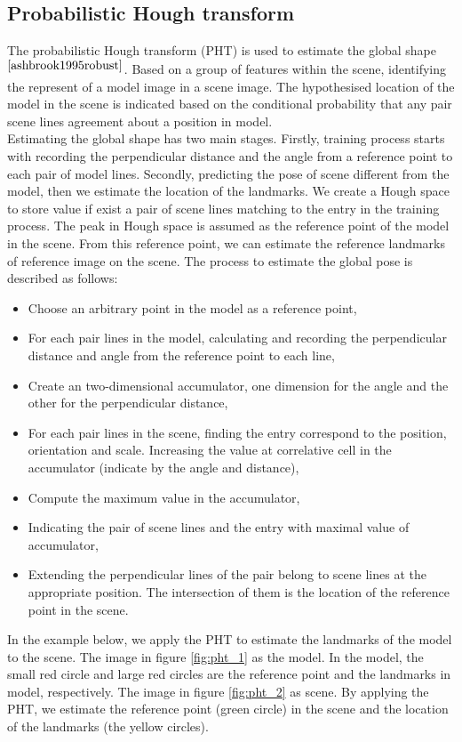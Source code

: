 \subsection{Probabilistic Hough transform}
The probabilistic Hough transform (PHT) is used to estimate the global shape$^{\cite{ashbrook1995robust}}$. Based on a group of features within the scene, identifying the represent of a model image in a scene image. The hypothesised location of the model in the scene is indicated based on the conditional probability that any pair scene lines agreement about a position in model.\\[0.3cm]
Estimating the global shape has two main stages. Firstly, training process starts with recording the perpendicular distance and the angle from a reference point to each pair of model lines. Secondly, predicting the pose of scene different from the model, then we estimate the location of the landmarks. We create a Hough space to store value if exist a pair of scene lines matching to the entry in the training process. The peak in Hough space is assumed as the reference point of the model in the scene. From this reference point, we can estimate the reference landmarks of reference image on the scene.
The process to estimate the global pose is described as follows:
\begin{itemize}
\item Choose an arbitrary point in the model as a reference point,
\item For each pair lines in the model, calculating and recording the perpendicular distance and angle from the reference point to each line,
\item Create an two-dimensional accumulator, one dimension for the angle and the other for the perpendicular distance,
\item For each pair lines in the scene, finding the entry correspond to the position, orientation and scale. Increasing the value at correlative cell in the accumulator (indicate by the angle and distance),
\item Compute the maximum value in the accumulator,
\item Indicating the pair of scene lines and the entry with maximal value of accumulator,
\item Extending the perpendicular lines of the pair belong to scene lines at the appropriate position. The intersection of them is the location of the reference point in the scene.
\end{itemize}
In the example below, we apply the PHT to estimate the landmarks of the model to the scene. The image in figure \ref{fig:pht_1} as the model. In the model, the small red circle and large red circles are the reference point and the landmarks in model, respectively. The image in figure \ref{fig:pht_2} as scene. By applying the PHT, we estimate the reference point (green circle) in the scene and the location of the landmarks (the yellow circles).
